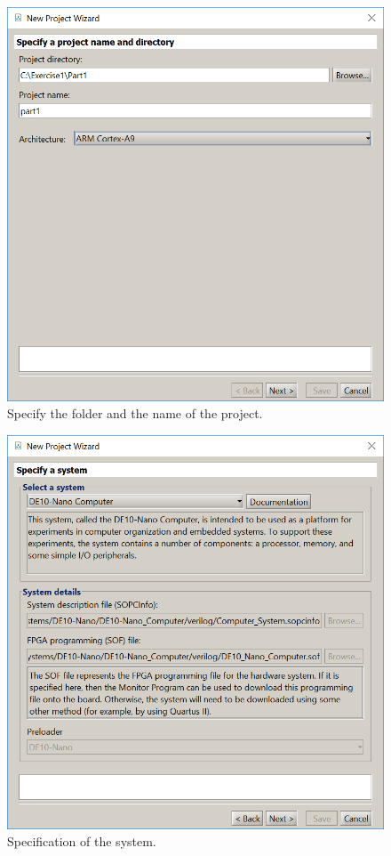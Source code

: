 \documentclass[epsfig,10pt,fullpage]{article}
\begin{document}
\begin{enumerate}
\begin{figure}[H]
	\begin{center}
	\includegraphics[scale=0.67]{figures/figureMP2.png}
	\end{center}
	\caption{Specify the folder and the name of the project.}
\label{fig:MP2}
\end{figure}

\begin{figure}[H]
	\begin{center}
	\includegraphics[scale=0.67]{figures/figureMP3.png}
	\end{center}
	\caption{Specification of the system.}
\label{fig:MP3}
\end{figure}


\end{enumerate}
\end{document}
